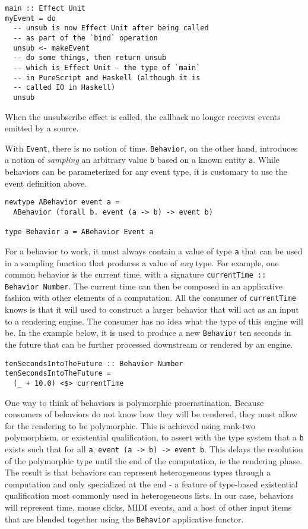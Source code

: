 \documentclass{sig-alternate}
\begin{document}
\begin{sloppypar}
  \begin{verbatim}
main :: Effect Unit
myEvent = do
  -- unsub is now Effect Unit after being called
  -- as part of the `bind` operation
  unsub <- makeEvent
  -- do some things, then return unsub
  -- which is Effect Unit - the type of `main`
  -- in PureScript and Haskell (although it is
  -- called IO in Haskell)
  unsub 
\end{verbatim}

  When the unsubscribe effect is called, the callback no longer receives events emitted by a source.

  With \texttt{Event}, there is no notion of time.  \texttt{Behavior}, on the other hand, introduces a notion of \textit{sampling} an arbitrary value \texttt{b} based on a known entity \texttt{a}. While behaviors can be parameterized for any event type, it is customary to use the event definition above.
  \begin{verbatim}
newtype ABehavior event a =
  ABehavior (forall b. event (a -> b) -> event b)

type Behavior a = ABehavior Event a
       \end{verbatim}

  For a behavior to work, it must always contain a value of type \texttt{a} that can be used in a sampling function that produces a value of \textit{any} type. For example, one common behavior is the current time, with a signature \verb=currentTime :: Behavior Number=. The current time can then be composed in an applicative fashion with other elements of a computation.  All the consumer of \verb=currentTime= knows is that it will used to construct a larger behavior that will act as an input to a rendering engine. The consumer has no idea what the type of this engine will be.  In the example below, it is used to produce a new \verb=Behavior= ten seconds in the future that can be further processed downstream or rendered by an engine.
  \begin{verbatim}
tenSecondsIntoTheFuture :: Behavior Number
tenSecondsIntoTheFuture =
  (_ + 10.0) <$> currentTime
       \end{verbatim}

  One way to think of behaviors is polymorphic procrastination.  Because consumers of behaviors do not know how they will be rendered, they must allow for the rendering to be polymorphic. This is achieved using rank-two polymorphism, or existential qualification, to assert with the type system that a \texttt{b} exists such that for all \texttt{a}, \verb=event (a -> b) -> event b=.  This delays the resolution of the polymorphic type until the end of the computation, ie the rendering phase.  The result is that behaviors can represent heterogeneous types through a computation and only specialized at the end - a feature of type-based existential qualification most commonly used in heterogeneous lists.\cite{kiselyov2004strongly} In our case, behaviors will represent time, mouse clicks, MIDI events, and a host of other input items that are blended together using the \texttt{Behavior} applicative functor.


\end{sloppypar}
\end{document}
